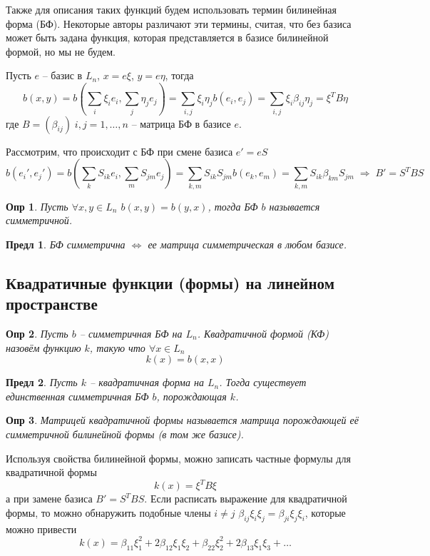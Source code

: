 \documentclass[a4paper,12pt]{article}
\newtheorem*{definition}{Опр}
\newtheorem{propos}{Предл}[section]
\begin{document}
Также для описания таких функций будем использовать термин билинейная форма (БФ). Некоторые авторы различают эти термины, считая, что без базиса может быть задана функция, которая представляется в базисе билинейной формой, но мы не будем.

Пусть $e$ -- базис в $L_n$, $x = e\xi$, $y = e\eta$, тогда 
\[
	b(x,y) = b\left( \sum_{i} \xi_i e_i, \sum_{j} \eta_j e_j \right) = \sum_{i,j} \xi_i \eta_j b(e_i, e_j) = \sum_{i,j} \xi_i \beta_{ij} \eta_j  = \xi^T B \eta
\]
где $B = (\beta_{ij}) \; i,j = 1,\ldots, n$ -- матрица БФ в базисе $e$. 

Рассмотрим, что происходит с БФ при смене базиса $e' = eS$
\[
	b(e_i', e_j') = b\left( \sum_{k} S_{ik} e_i, \sum_{m} S_{jm} e_j \right) =  \sum_{k, m} S_{ik} S_{jm} b(e_k, e_m) = \sum_{k, m} S_{ik} \beta_{km} S_{jm} \; \Rightarrow \; B' = S^T B S
\]

\begin{definition}
	Пусть $\forall x,y \in L_n$ $b(x,y) = b(y,x)$, тогда БФ $b$ называется симметричной.
\end{definition}

\begin{propos}
	БФ симметрична $\Leftrightarrow$ ее матрица симметрическая в любом базисе.
\end{propos}



\subsection{Квадратичные функции (формы) на линейном пространстве}

\begin{definition}
	Пусть $b$ -- симметричная БФ на $L_n$. Квадратичной формой (КФ) назовём функцию $k$, такую что $\forall x \in L_n$ 
	\[
		k(x) = b(x,x)
	\]
\end{definition}

\begin{propos}
	Пусть $k$ -- квадратичная форма на $L_n$. Тогда существует единственная симметричная БФ $b$, порождающая $k$.
\end{propos}

\begin{definition}
	Матрицей квадратичной формы называется матрица порождающей её симметричной билинейной формы (в том же базисе).
\end{definition}

Используя свойства билинейной формы, можно записать частные формулы для квадратичной формы
\[
	k(x) = \xi^T B \xi
\]
а при замене базиса $B' = S^T B S$. Если расписать выражение для квадратичной формы, то можно обнаружить подобные члены $i \ne j$ $\beta_{ij} \xi_i \xi_j = \beta_{ji} \xi_j \xi_i$, которые можно привести
\[
	k(x) = \beta_{11} \xi_1^2 + 2 \beta_{12} \xi_1 \xi_2 + \beta_{22} \xi_2^2 + 2\beta_{13} \xi_1 \xi_3 + \ldots
\]
\end{document}
